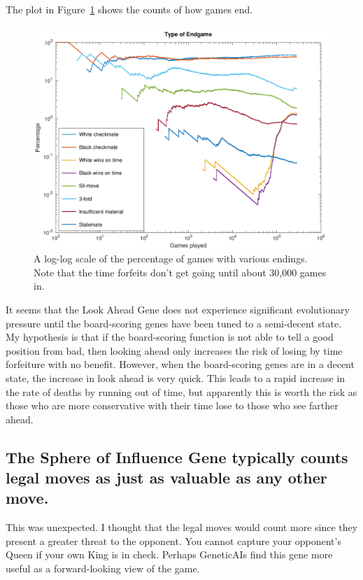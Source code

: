 \documentclass[letterpaper]{article}
\renewcommand{\_}{\allowbreak\textunderscore\allowbreak}
\begin{document}
The plot in Figure~\ref{game-ending-plot} shows the counts of how games end.
\begin{figure}[htb]
	\centering
	\includegraphics[width=\textwidth]{game-endings-log-plot}
	\caption{A log-log scale of the percentage of games with various endings. Note that the time forfeits don't get going until about 30,000 games in.}
	\label{game-ending-plot}
\end{figure}
It seems that the Look Ahead Gene does not experience significant evolutionary pressure until the board-scoring genes have been tuned to a semi-decent state. My hypothesis is that if the board-scoring function is not able to tell a good position from bad, then looking ahead only increases the risk of losing by time forfeiture with no benefit. However, when the board-scoring genes are in a decent state, the increase in look ahead is very quick. This leads to a rapid increase in the rate of deaths by running out of time, but apparently this is worth the risk as those who are more conservative with their time lose to those who see farther ahead.

\subsection{The Sphere of Influence Gene typically counts legal moves as just as valuable as any other move.}

This was unexpected. I thought that the legal moves would count more since they present a greater threat to the opponent. You cannot capture your opponent's Queen if your own King is in check. Perhaps Genetic\_AIs find this gene more useful as a forward-looking view of the game.
\end{document}
